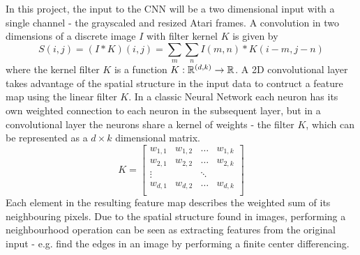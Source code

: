 \documentclass[11pt]{article}
\begin{document}
In this project, the input to the CNN will be a two dimensional input with a single
channel - the grayscaled and resized Atari frames.
A convolution in two dimensions of a discrete image $I$ with filter kernel $K$
is given by 
\begin{equation}
    S(i, j) = (I \ast K)(i, j) = \sum\limits_m \sum\limits_n I(m, n) * K(i - m, j - n)
\end{equation}
where the kernel filter $K$ is a function $K : \mathbb{R}^{(d, k)} \to \mathbb{R}$.
A 2D convolutional layer takes advantage of the spatial structure in the input data to contruct a feature map
using the linear filter $K$.
In a classic Neural Network each neuron has its own weighted connection to each neuron in the subsequent layer,
but in a convolutional layer the neurons share a kernel of weights - the filter $K$, which can be represented as
a $d \times k$ dimensional matrix.
$$
K =
\begin{bmatrix}
    w_{1,1 } & w_{1, 2} & \hdots & w_{1, k} \\
    w_{2,1 } & w_{2, 2} & \hdots & w_{2, k} \\
    \vdots   &          & \ddots &          \\
    w_{d,1 } & w_{d, 2} & \hdots & w_{d, k} \\
\end{bmatrix}
$$
Each element in the resulting feature map describes the weighted sum of its neighbouring
pixels.
Due to the spatial structure found in images, performing a neighbourhood operation
can be seen as extracting features from the original input - e.g. find the
edges in an image by performing a finite center differencing.
\end{document}
